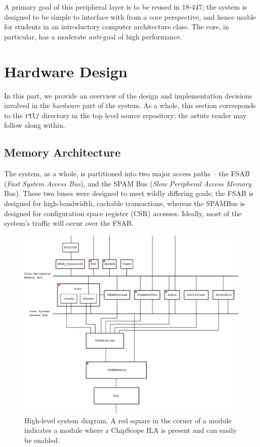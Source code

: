 \documentclass[10pt]{report}
\begin{document}
A primary goal of this peripheral layer is to be reused in 18-447; the system
is designed to be simple to interface with from a core perspective, and
hence usable for students in an introductory computer architecture class. 
The core, in particular, has a moderate \textit{anti}-goal of high
performance.

\chapter{Hardware Design}

\label{par:hardware}

In this part, we provide an overview of the design and implementation
decisions involved in the \textit{hardware} part of the system.  As a whole,
this section corresponds to the \texttt{rtl/} directory in the top level
source repository; the astute reader may follow along within.

\section{Memory Architecture}

\label{sec:memory}

The system, as a whole, is partitioned into two major access paths -- the
FSAB (\textit{Fast System Access Bus}), and the SPAM Bus (\textit{Slow
Peripheral Access Memory} Bus).  These two buses were designed to meet
wildly differing goals; the FSAB is designed for high-bandwidth, cachable
transactions, whereas the SPAMBus is designed for configuration space
register (CSR) accesses.  Ideally, most of the system's traffic will occur
over the FSAB.

\begin{figure}
  \centering
    \includegraphics[width=.8\textwidth]{block_diagram.pdf}
  \caption{High-level system diagram. A red square in the corner of a module
           indicates a module where a ChipScope ILA is present and can easily
           be enabled.}
  \label{system_diagram}
\end{figure}
\end{document}
